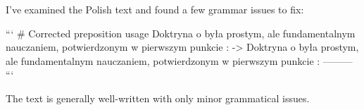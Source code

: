 I've examined the Polish text and found a few grammar issues to fix:

```
# Corrected preposition usage
Doktryna o  była prostym, ale fundamentalnym nauczaniem, potwierdzonym w pierwszym punkcie :
->
Doktryna o  była prostym, ale fundamentalnym nauczaniem, potwierdzonym w pierwszym punkcie :
---------
```

The text is generally well-written with only minor grammatical issues.